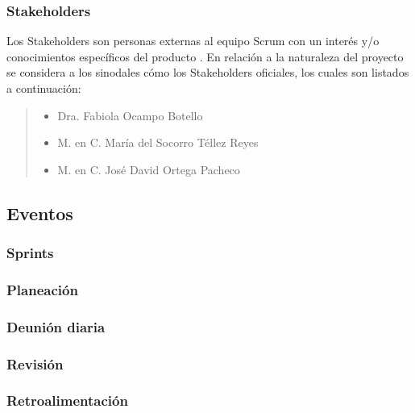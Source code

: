 
\subsubsection{Stakeholders}

 Los Stakeholders son personas externas al equipo Scrum con un interés y/o conocimientos
 específicos del producto \cite{ScrumGlosary}. En relación a la naturaleza del proyecto se
 considera a los sinodales cómo los Stakeholders oficiales, los cuales son listados a
 continuación:

    \begin{quote}
    \begin{itemize}
        \item Dra. Fabiola Ocampo Botello
        \item M. en C. María del Socorro Téllez Reyes
        \item M. en C. José David Ortega Pacheco
    \end{itemize}
    \end{quote}

\subsection{Eventos}

\subsubsection{Sprints}
\subsubsection{Planeación}
\subsubsection{Deunión diaria}
\subsubsection{Revisión}
\subsubsection{Retroalimentación}

    
